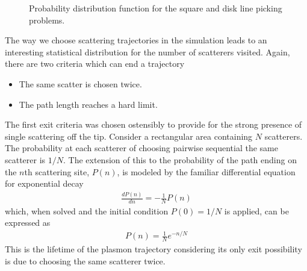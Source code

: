\begin{figure}
	\begin{center}
	\end{center}
	\caption{Probability distribution function for the square and disk line
		picking problems.}
	\label{fig:linepickingpdf}
\end{figure}
The way we choose scattering trajectories in the simulation leads to an
interesting statistical distribution for the number of scatterers visited.
Again, there are two criteria which can end a trajectory
\begin{itemize}
	\item The same scatter is chosen twice.
	\item The path length reaches a hard limit.
\end{itemize}
The first exit criteria was chosen ostensibly to provide for the strong
presence of single scattering off the tip.  Consider a rectangular area
containing $N$ scatterers.  The probability at each scatterer of choosing
pairwise sequential the same scatterer is $1/N$.  The extension of this to
the probability of the path ending on the $n$th scattering site, $P(n)$, is
modeled by the familiar differential equation for exponential decay
\begin{align}
	\frac{d P(n)}{dn} = -\frac{1}{N}P(n)
\end{align}
which, when solved and the initial condition $P(0)=1/N$ is applied, can be
expressed as
\begin{align}
	P(n)=\frac{1}{N}e^{-n/N}
\end{align}
This is the lifetime of the plasmon trajectory considering its only exit
possibility is due to choosing the same scatterer twice.

